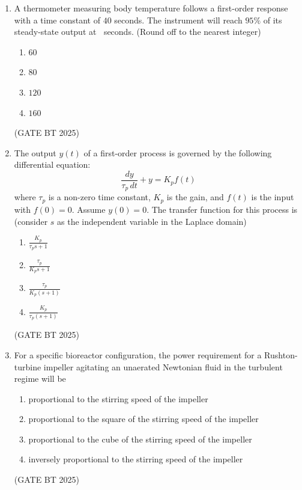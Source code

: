 \documentclass[journal,12pt,onecolumn]{IEEEtran}
\theoremstyle{remark}
\begin{document}
\begin{enumerate}
\item A thermometer measuring body temperature follows a first-order response with a time constant of $40$ seconds. The instrument will reach $95\%$ of its steady-state output at $~$ seconds. (Round off to the nearest integer)
\begin{multicols}{2}
\begin{enumerate}
    \item $60$
    \item $80$
    \item $120$
    \item $160$
\end{enumerate}
\end{multicols}
\hfill (GATE BT 2025)

\item The output $y(t)$ of a first-order process is governed by the following differential equation:
\[
\frac{dy}{\tau_p \, dt} + y = K_p f(t)
\]
where $\tau_p$ is a non-zero time constant, $K_p$ is the gain, and $f(t)$ is the input with $f(0) = 0$. Assume $y(0) = 0$. The transfer function for this process is (consider $s$ as the independent variable in the Laplace domain)

\begin{enumerate}
    \item $\frac{K_p}{\tau_p s + 1}$
    \item $\frac{\tau_p}{K_p s + 1}$
    \item $\frac{\tau_p}{K_p (s + 1)}$
    \item $\frac{K_p}{\tau_p (s + 1)}$
\end{enumerate}
\hfill (GATE BT 2025)

\item For a specific bioreactor configuration, the power requirement for a Rushton-turbine impeller agitating an unaerated Newtonian fluid in the turbulent regime will be

\begin{enumerate}
    \item proportional to the stirring speed of the impeller
    \item proportional to the square of the stirring speed of the impeller
    \item proportional to the cube of the stirring speed of the impeller
    \item inversely proportional to the stirring speed of the impeller
\end{enumerate}
\hfill (GATE BT 2025)


\end{enumerate}
\end{document}
